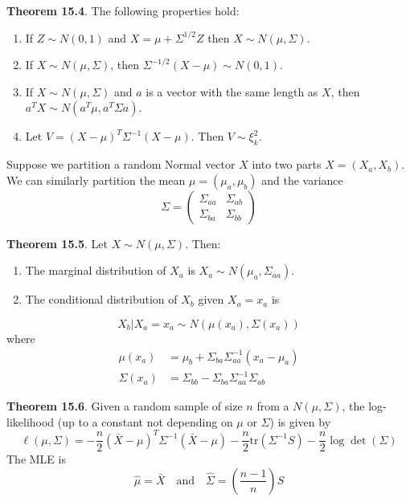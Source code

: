 \textbf{Theorem 15.4}. The following properties hold:
\begin{enumerate}[label={\arabic*.}]
\item
  If \(Z \sim N(0, 1)\) and \(X = \mu + \Sigma^{1/2} Z\) then
  \(X \sim N(\mu, \Sigma)\).
\item
  If \(X \sim N(\mu, \Sigma)\), then
  \(\Sigma^{-1/2}(X - \mu) \sim N(0, 1)\).
\item
  If \(X \sim N(\mu, \Sigma)\) and \(a\) is a vector with the same
  length as \(X\), then \(a^T X \sim N(a^T \mu, a^T \Sigma a)\).
\item
  Let \(V = (X - \mu)^T \Sigma^{-1} (X - \mu)\). Then
  \(V \sim \xi_{k}^{2}\).
\end{enumerate}
Suppose we partition a random Normal vector \(X\) into two parts
\(X = (X_a, X_b)\). We can similarly partition the mean
\(\mu = (\mu_a, \mu_b)\) and the variance
\[
\Sigma = \begin{pmatrix} 
\Sigma_{aa} & \Sigma_{ab} \\
\Sigma_{ba} & \Sigma_{bb}
\end{pmatrix}
\]

\textbf{Theorem 15.5}. Let \(X \sim N(\mu, \Sigma)\). Then:
\begin{enumerate}[tightlist,label={\arabic*.}]
\item
  The marginal distribution of \(X_a\) is
  \(X_a \sim N(\mu_a, \Sigma_{aa})\).
\item
  The conditional distribution of \(X_b\) given \(X_a = x_a\) is
\end{enumerate}
\[
X_b | X_a = x_a \sim N(\mu(x_a), \Sigma(x_a))
\]
where
\begin{align*}
\mu(x_a) &= \mu_b + \Sigma_{ba} \Sigma_{aa}^{-1} (x_a - \mu_a) \\
\Sigma(x_a) &= \Sigma_{bb} - \Sigma_{ba}\Sigma_{aa}^{-1}\Sigma_{ab}
\end{align*}

\textbf{Theorem 15.6}. Given a random sample of size \(n\) from a
\(N(\mu, \Sigma)\), the log-likelihood (up to a constant not depending
on \(\mu\) or \(\Sigma\)) is given by
\[
\ell(\mu, \Sigma) = -\frac{n}{2} (\bar{X} - \mu)^T \Sigma^{-1} (\bar{X} - \mu) - \frac{n}{2} \text{tr} \left( \Sigma^{-1}S \right) - \frac{n}{2} \log \det \left( \Sigma \right)
\]
The MLE is
\[
\hat{\mu} = \bar{X} 
\quad \text{and} \quad
\hat{\Sigma} = \left( \frac{n - 1}{n} \right) S
\]

